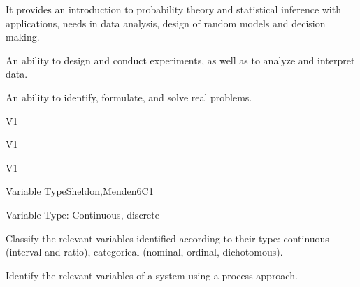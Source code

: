 
\begin{syllabus}


\begin{justification}
It provides an introduction to probability theory and statistical inference with applications, needs in data analysis, design of random models and decision making.
\end{justification}

\begin{goals}
\item An ability to design and conduct experiments, as well as to analyze and interpret data.
\item An ability to identify, formulate, and solve real problems.
\end{goals}

\begin{outcomes}{V1}
      \item {}
      \item {}
\end{outcomes}

\begin{specificoutcomes}{V1}
      \item {}
      \item {}
      \item {}
      \item {}
      \item {}
\end{specificoutcomes}

\begin{competences}{V1}
      \item {} 
      \item {}
\end{competences}

\begin{unit}{Variable Type}{}{Sheldon,Menden}{6}{C1}
\begin{topics}
      \item Variable Type: Continuous, discrete
   \end{topics}

   \begin{learningoutcomes}
      \item Classify the relevant variables identified according to their type: continuous (interval and ratio), categorical (nominal, ordinal, dichotomous).
      \item Identify the relevant variables of a system using a process approach.
   \end{learningoutcomes}
\end{unit}


\end{syllabus}

